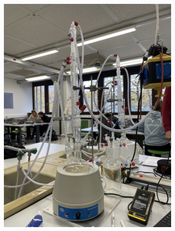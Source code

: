 \begin{figure}[H]
    \label{fig:Messaufbau}
    \begin{subfigure}{0.45\textwidth}
    \includegraphics[angle=270,scale=0.05]{content/Verwendete_Messapparatur.jpeg}
    \label{Abb:Messapparatur}
    \end{subfigure}
    \hfill
    \begin{subfigure}{0.45\textwidth}

\end{subfigure}
\end{figure}
